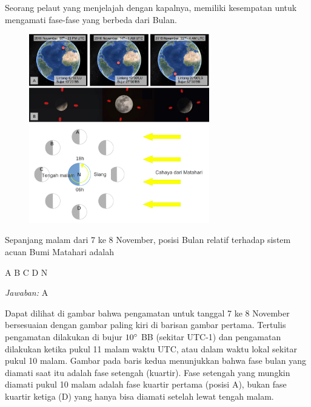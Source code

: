 \documentclass[11pt,fleqn]{exam}
\begin{document}
\bigskip
\begin{questions}

\question Seorang pelaut yang menjelajah dengan kapalnya, memiliki kesempatan untuk mengamati fase-fase yang berbeda dari Bulan.

\begin{figure}[H]
\centering
\includegraphics[width=0.7\textwidth]{osp2022_1a.png}
\includegraphics[width=0.7\textwidth]{osp2022_1b.png}
\label{fig:osp2022_1}
\end{figure}

Sepanjang malam dari 7 ke 8 November, posisi Bulan relatif terhadap sistem acuan Bumi Matahari adalah

\begin{choices}
\choice A
\choice B
\choice C
\choice D
\choice N
\end{choices}

\bigskip
\textit{Jawaban: } A

Dapat dilihat di gambar bahwa pengamatan untuk tanggal 7 ke 8 November bersesuaian dengan gambar paling kiri di barisan gambar pertama. Tertulis pengamatan dilakukan di bujur $10\degree$ BB (sekitar UTC-1) dan pengamatan dilakukan ketika pukul 11 malam waktu UTC, atau dalam waktu lokal sekitar pukul 10 malam. Gambar pada baris kedua menunjukkan bahwa fase bulan yang diamati saat itu adalah fase setengah (kuartir). Fase setengah yang mungkin diamati pukul 10 malam adalah fase kuartir pertama (posisi A), bukan fase kuartir ketiga (D) yang hanya bisa diamati setelah lewat tengah malam. 



\end{questions}
\end{document}
